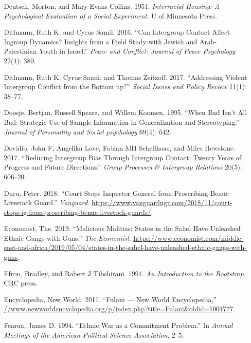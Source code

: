 \documentclass[11pt]{article}
\begin{document}
\begin{cslreferences}
\leavevmode\hypertarget{ref-deutsch1951interracial}{}%
Deutsch, Morton, and Mary Evans Collins. 1951. \emph{Interracial
Housing: A Psychological Evaluation of a Social Experiment}. U of
Minnesota Press.

\leavevmode\hypertarget{ref-ditlmann2016can}{}%
Ditlmann, Ruth K, and Cyrus Samii. 2016. ``Can Intergroup Contact Affect
Ingroup Dynamics? Insights from a Field Study with Jewish and
Arab-Palestinian Youth in Israel.'' \emph{Peace and Conflict: Journal of
Peace Psychology} 22(4): 380.

\leavevmode\hypertarget{ref-ditlmann2017addressing}{}%
Ditlmann, Ruth K, Cyrus Samii, and Thomas Zeitzoff. 2017. ``Addressing
Violent Intergroup Conflict from the Bottom up?'' \emph{Social Issues
and Policy Review} 11(1): 38--77.

\leavevmode\hypertarget{ref-doosje1995bad}{}%
Doosje, Bertjan, Russell Spears, and Willem Koomen. 1995. ``When Bad
Isn't All Bad: Strategic Use of Sample Information in Generalization and
Stereotyping.'' \emph{Journal of Personality and Social psychology}
69(4): 642.

\leavevmode\hypertarget{ref-dovidio2017reducing}{}%
Dovidio, John F, Angelika Love, Fabian MH Schellhaas, and Miles
Hewstone. 2017. ``Reducing Intergroup Bias Through Intergroup Contact:
Twenty Years of Progress and Future Directions.'' \emph{Group Processes
\& Intergroup Relations} 20(5): 606--20.

\leavevmode\hypertarget{ref-duru2018court}{}%
Duru, Peter. 2018. ``Court Stops Inspector General from Proscribing
Benue Livestock Guard.'' \emph{Vanguard}.
\url{https://www.vanguardngr.com/2018/11/court-stops-ig-from-proscribing-benue-livestock-guards/}.

\leavevmode\hypertarget{ref-economist2019militias}{}%
Economist, The. 2019. ``Malicious Malitias: States in the Sahel Have
Unleashed Ethnic Gangs with Guns.'' \emph{The Economist}.
\url{https://www.economist.com/middle-east-and-africa/2019/05/04/states-in-the-sahel-have-unleashed-ethnic-gangs-with-guns}.

\leavevmode\hypertarget{ref-efron1994introduction}{}%
Efron, Bradley, and Robert J Tibshirani. 1994. \emph{An Introduction to
the Bootstrap}. CRC press.

\leavevmode\hypertarget{ref-fulanisize2017}{}%
Encyclopedia, New World. 2017. ``Fulani --- New World Encyclopedia,''
\url{//www.newworldencyclopedia.org/p/index.php?title=Fulani\&oldid=1004777}.

\leavevmode\hypertarget{ref-fearon1994ethnic}{}%
Fearon, James D. 1994. ``Ethnic War as a Commitment Problem.'' In
\emph{Annual Meetings of the American Political Science Association},
2--5.


\end{cslreferences}
\end{document}
